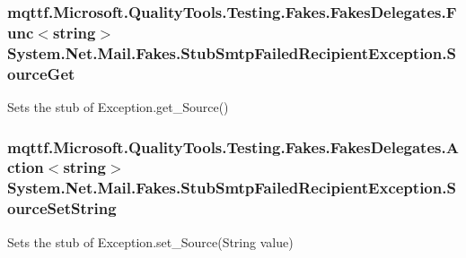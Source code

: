 \hypertarget{class_system_1_1_net_1_1_mail_1_1_fakes_1_1_stub_smtp_failed_recipient_exception_a0da06c36db2ee51ba4219cb08d71ed03}{
\subsubsection[{Source\-Get}]{\setlength{\rightskip}{0pt plus 5cm}mqttf.\-Microsoft.\-Quality\-Tools.\-Testing.\-Fakes.\-Fakes\-Delegates.\-Func$<$string$>$ System.\-Net.\-Mail.\-Fakes.\-Stub\-Smtp\-Failed\-Recipient\-Exception.\-Source\-Get}}\label{class_system_1_1_net_1_1_mail_1_1_fakes_1_1_stub_smtp_failed_recipient_exception_a0da06c36db2ee51ba4219cb08d71ed03}


Sets the stub of Exception.\-get\-\_\-\-Source()

\hypertarget{class_system_1_1_net_1_1_mail_1_1_fakes_1_1_stub_smtp_failed_recipient_exception_a03778ba793ce27a0743c42e0c01cb1e5}{
\subsubsection[{Source\-Set\-String}]{\setlength{\rightskip}{0pt plus 5cm}mqttf.\-Microsoft.\-Quality\-Tools.\-Testing.\-Fakes.\-Fakes\-Delegates.\-Action$<$string$>$ System.\-Net.\-Mail.\-Fakes.\-Stub\-Smtp\-Failed\-Recipient\-Exception.\-Source\-Set\-String}}\label{class_system_1_1_net_1_1_mail_1_1_fakes_1_1_stub_smtp_failed_recipient_exception_a03778ba793ce27a0743c42e0c01cb1e5}


Sets the stub of Exception.\-set\-\_\-\-Source(\-String value)

